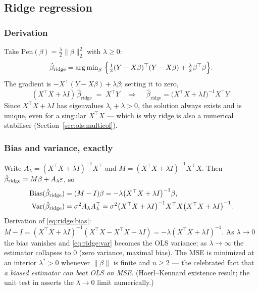 \subsection{Ridge regression}
\label{sec:ridge}

\subsubsection{Derivation}
\label{sec:ridge:derivation}

Take $\mathrm{Pen}(\beta)=\tfrac{\lambda}{2}\lVert\beta\rVert_2^2$ with $\lambda\ge0$:
\begin{equation}
  \hat\beta_{\text{ridge}} = \argmin_\beta\ \Bigl\{\tfrac12 (Y-X\beta)^{\top}(Y-X\beta)
  + \tfrac{\lambda}{2}\beta^{\top}\beta\Bigr\}.
\end{equation}
The gradient is $-X^{\top}(Y-X\beta)+\lambda\beta$; setting it to zero,
\begin{equation}
  (X^{\top}X+\lambda I)\,\hat\beta_{\text{ridge}} \;=\; X^{\top}Y
  \quad\Longrightarrow\quad
  \boxed{\ \hat\beta_{\text{ridge}} = \bigl(X^{\top}X+\lambda I\bigr)^{-1}X^{\top}Y\ }
  \label{eq:ridge}
\end{equation}
Since $X^{\top}X+\lambda I$ has eigenvalues $\lambda_i+\lambda>0$, the solution always
exists and is unique, even for a singular $X^{\top}X$ --- which is why ridge is also a
numerical stabiliser (Section~\ref{sec:ols:multicol}).

\subsubsection{Bias and variance, exactly}
\label{sec:ridge:biasvar}

Write $A_\lambda=(X^{\top}X+\lambda I)^{-1}X^{\top}$ and
$M = (X^{\top}X+\lambda I)^{-1}X^{\top}X$. Then
$\hat\beta_{\text{ridge}} = M\beta + A_\lambda\varepsilon$, so
\begin{align}
  \operatorname{Bias}(\hat\beta_{\text{ridge}}) &= (M-I)\beta
    = -\lambda\bigl(X^{\top}X+\lambda I\bigr)^{-1}\beta, \label{eq:ridge:bias}\\
  \operatorname{Var}(\hat\beta_{\text{ridge}}) &= \sigma^2 A_\lambda A_\lambda^{\top}
    = \sigma^2\bigl(X^{\top}X+\lambda I\bigr)^{-1}X^{\top}X\bigl(X^{\top}X+\lambda I\bigr)^{-1}.
    \label{eq:ridge:var}
\end{align}
Derivation of \eqref{eq:ridge:bias}: $M-I=(X^{\top}X+\lambda I)^{-1}(X^{\top}X - X^{\top}X-\lambda I)
= -\lambda(X^{\top}X+\lambda I)^{-1}$. As $\lambda\to0$ the bias vanishes and
\eqref{eq:ridge:var} becomes the OLS variance; as $\lambda\to\infty$ the estimator
collapses to $0$ (zero variance, maximal bias). The MSE is minimized at an interior
$\lambda^\ast>0$ whenever $\lVert\beta\rVert$ is finite and $n\ge2$ --- the celebrated
fact that \emph{a biased estimator can beat OLS on MSE}. (Hoerl--Kennard existence
result; the unit test in  asserts the
$\lambda\to0$ limit numerically.)


